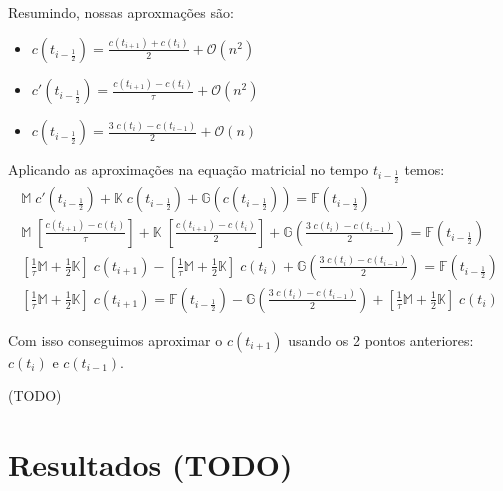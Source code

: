\documentclass[a4paper]{article}
\begin{document}
Resumindo, nossas aproxmações são:
\begin{itemize}
\item \(
    c(t_{i-\frac12})
    =
    \frac{c(t_{i+1}) + c(t_i)}{2}
    + \mathcal{O}(n^2)
\)
\item \(
    c'(t_{i-\frac12})
    =
    \frac{c(t_{i+1}) - c(t_i)}{\tau}
    + \mathcal{O}(n^2)
\)
\item \(
    c(t_{i-\frac12})
    =
    \frac{3 \; c(t_i) - c(t_{i-1})}{2}
    + \mathcal{O}(n)
\)
\end{itemize}

Aplicando as aproximações na equação matricial
no tempo \(t_{i-\frac12}\)
temos:
\[ \begin{array}{l} \displaystyle
    \mathbb{M} \; c'(t_{i-\frac12})
    + \mathbb{K} \; c(t_{i-\frac12})
    + \mathbb{G}(c(t_{i-\frac12}))
    = \mathbb{F}\left( t_{i-\frac12} \right)
    \\[3ex] \displaystyle
    \mathbb{M} \; \left[ \frac{c(t_{i+1}) - c(t_i)}{\tau} \right]
    + \mathbb{K} \; \left[ \frac{c(t_{i+1}) - c(t_i)}{2} \right]
    + \mathbb{G}\left( \frac{3 \; c(t_i) - c(t_{i-1})}{2} \right)
    = \mathbb{F}\left( t_{i-\frac12} \right)
    \\[3ex] \displaystyle
    \left[ \frac1\tau \mathbb{M} + \frac12 \mathbb{K} \right] \; c(t_{i+1})
    - \left[ \frac1\tau \mathbb{M} + \frac12 \mathbb{K} \right] \; c(t_i)
    + \mathbb{G}\left( \frac{3 \; c(t_i) - c(t_{i-1})}{2} \right)
    = \mathbb{F}\left( t_{i-\frac12} \right)
    \\[3ex] \displaystyle
    \left[ \frac1\tau \mathbb{M} + \frac12 \mathbb{K} \right] \; c(t_{i+1})
    = \mathbb{F}\left( t_{i-\frac12} \right)
    - \mathbb{G}\left( \frac{3 \; c(t_i) - c(t_{i-1})}{2} \right)
    + \left[ \frac1\tau \mathbb{M} + \frac12 \mathbb{K} \right] \; c(t_i)
\end{array} \]

Com isso conseguimos aproximar o
\(c(t_{i+1})\) usando os 2 pontos anteriores:
\(c(t_i)\) e \(c(t_{i-1})\).

(TODO)

\newpage
\section{Resultados (TODO)}

\end{document}
